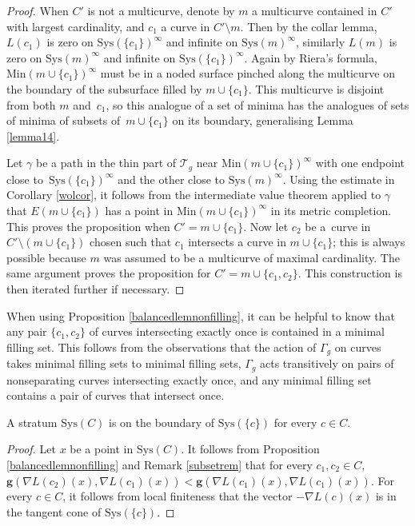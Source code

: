 \begin{proof}
When $C'$ is not a multicurve, denote by $m$ a multicurve contained in $C'$ with largest cardinality, and $c_{1}$ a curve in $C'\setminus m$. Then by the collar lemma, $L(c_{1})$ is zero on $\mathrm{Sys}(\{c_{1}\})^{\infty}$ and infinite on $\mathrm{Sys}(m)^{\infty}$, similarly $L(m)$ is zero on $\mathrm{Sys}(m)^{\infty}$ and infinite on $\mathrm{Sys}(\{c_{1}\})^{\infty}$. Again by Riera's formula, $\mathrm{Min}(m\cup\{c_{1}\})^{\infty}$ must be in a noded surface pinched along the multicurve on the boundary of the subsurface filled by $m\cup\{c_{1}\}$. This multicurve is disjoint from both $m$ and~$c_{1}$, so this analogue of a set of minima has the analogues of sets of minima of subsets of~${m\cup\{c_{1}\}}$ on its boundary, generalising Lemma \ref{lemma14}.

Let $\gamma$ be a path in the thin part of $\mathcal{T}_{g}$ near $\mathrm{Min}(m\cup\{c_{1}\})^{\infty}$ with one endpoint close to~$\mathrm{Sys}(\{c_{1}\})^{\infty}$ and the other close to $\mathrm{Sys}(m)^{\infty}$. Using the estimate in Corollary \ref{wolcor}, it follows from the intermediate value theorem applied to $\gamma$ that $E(m\cup\{c_{1}\})$ has a point in $\mathrm{Min}(m\cup\{c_{1}\})^{\infty}$ in its metric completion. This proves the proposition when $C'=m\cup \{c_{1}\}$. Now let $c_{2}$ be a~curve in $C'\setminus (m\cup \{c_{1}\})$ chosen such that $c_{1}$ intersects a curve in $m\cup \{c_{1}\}$; this is always possible because $m$ was assumed to be a multicurve of maximal cardinality. The same argument proves the proposition for $C'=m\cup \{c_{1},c_{2}\}$. This construction is then iterated further if necessary.
\end{proof}

\begin{Remark}
\label{subsetrem}
When using Proposition \ref{balancedlemnonfilling}, it can be helpful to know that any pair $\{c_{1}, c_{2}\}$ of curves intersecting exactly once is contained in a minimal filling set. This follows from the observations that the action of $\Gamma_{g}$ on curves takes minimal filling sets to minimal filling sets, $\Gamma_{g}$ acts transitively on pairs of nonseparating curves intersecting exactly once, and any minimal filling set contains a pair of curves that intersect once.
\end{Remark}

\begin{Corollary}
\label{polytopecor}
A stratum $\mathrm{Sys}(C)$ is on the boundary of $\mathrm{Sys}(\{c\})$ for every $c\in C$.
\end{Corollary}
\begin{proof}
Let $x$ be a point in $\mathrm{Sys}(C)$. It follows from Proposition \ref{balancedlemnonfilling} and Remark \ref{subsetrem} that for every $c_{1}, c_{2}\in C$, $\mathbf{g}(\nabla L(c_{2})(x),\nabla L(c_{1})(x))<\mathbf{g}(\nabla L(c_{1})(x), \nabla L(c_{1})(x))$. For every $c\in C$, it follows from local finiteness that the vector $-\nabla L(c)(x)$ is in the tangent cone of $\mathrm{Sys}(\{c\})$.
\end{proof}

